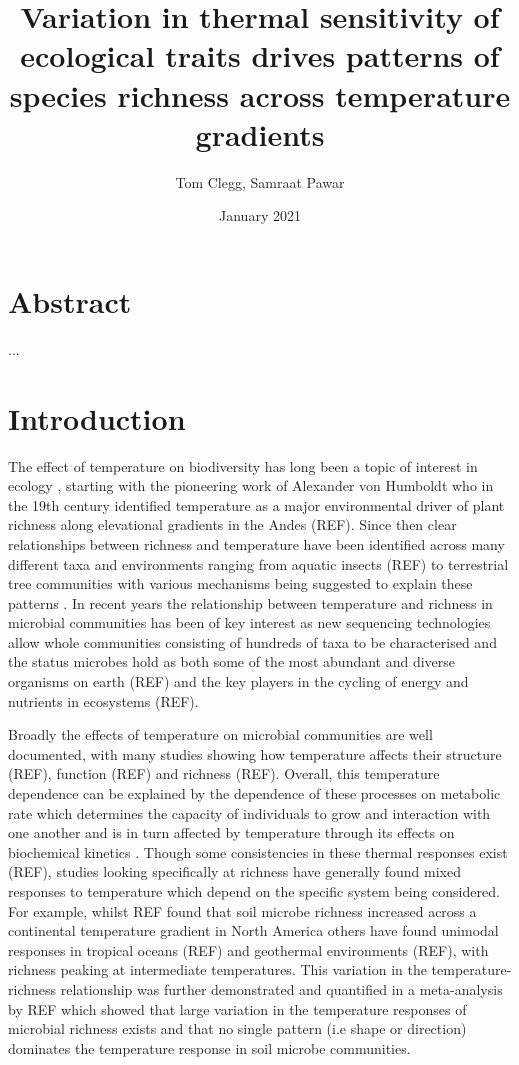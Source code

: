 \documentclass{article}
\title{Variation in thermal sensitivity of ecological traits drives patterns of species richness across temperature gradients}
\author{Tom Clegg, Samraat Pawar}
\date{January 2021}
\begin{document}
\maketitle

\section*{Abstract}

...

\section*{Introduction}

The effect of temperature on biodiversity has long been a topic of interest in ecology \citep{Gaston2000}, starting with the pioneering work of Alexander von Humboldt who in the 19th century identified temperature as a major environmental driver of plant richness along elevational gradients in the Andes (REF). Since then clear relationships between richness and temperature have been identified across many different taxa and environments ranging from aquatic insects (REF) to terrestrial tree communities \citep{Wang2009} with various mechanisms being suggested to explain these patterns \citep{Rohde1992,Gaston2000}. In recent years the relationship between temperature and richness in microbial communities has been of key interest as new sequencing technologies allow whole communities consisting of hundreds of taxa to be characterised and the status microbes hold as both some of the most abundant and diverse organisms on earth (REF) and the key players in the cycling of energy and nutrients in ecosystems (REF). 

Broadly the effects of temperature on microbial communities are well documented, with many studies showing how temperature affects their structure (REF), function (REF) and richness (REF). Overall, this temperature dependence can be explained by the dependence of these processes on metabolic rate which determines the capacity of individuals to grow and interaction with one another and is in turn affected by temperature through its effects on biochemical kinetics \cite{Gillooly2001,Brown2004}. Though some consistencies in these thermal responses exist (REF), studies looking specifically at richness have generally found mixed responses to temperature which depend on the specific system being considered. For example, whilst REF found that soil microbe richness increased across a continental temperature gradient in North America others have found unimodal responses in tropical oceans (REF) and geothermal environments (REF), with richness peaking at intermediate temperatures. This variation in the temperature-richness relationship was further demonstrated and quantified in a meta-analysis by REF which showed that large variation in the temperature responses of microbial richness exists and that no single pattern (i.e shape or direction) dominates the temperature response in soil microbe communities. 
\end{document}
